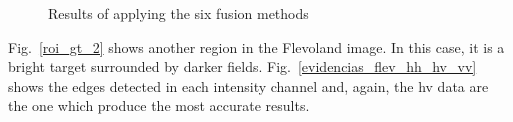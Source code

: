 \documentclass[journal]{IEEEtran}
\begin{document}
\begin{figure}[hbt]
     \caption{Results of applying the six fusion methods}
     \label{fusion_met}
\end{figure}

Fig.~\ref{roi_gt_2} shows another region in the Flevoland image.
In this case, it is a bright target surrounded by darker fields.
Fig.~\ref{evidencias_flev_hh_hv_vv} shows the edges detected in each intensity channel and, again, the hv data are the one which produce the most accurate results.
\end{document}
